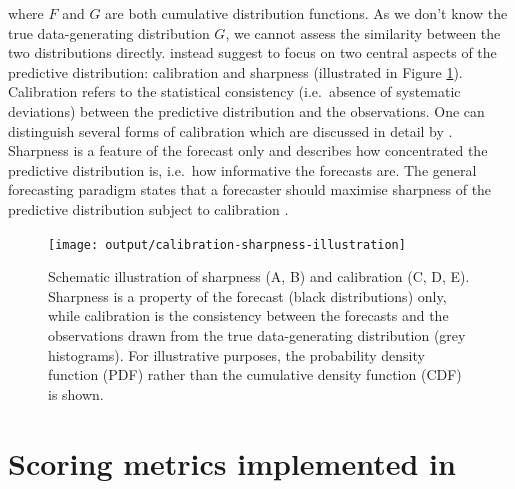 \documentclass[
]{jss}
\begin{document}
where \(F\) and \(G\) are both cumulative distribution functions. As we
don't know the true data-generating distribution \(G\), we cannot assess
the similarity between the two distributions directly.
\cite{gneitingProbabilisticForecastsCalibration2007} instead suggest to
focus on two central aspects of the predictive distribution: calibration
and sharpness (illustrated in Figure \ref{fig:forecast-paradigm}).
Calibration refers to the statistical consistency (i.e.~absence of
systematic deviations) between the predictive distribution and the
observations. One can distinguish several forms of calibration which are
discussed in detail by
\cite{gneitingProbabilisticForecastsCalibration2007}. Sharpness is a
feature of the forecast only and describes how concentrated the
predictive distribution is, i.e.~how informative the forecasts are. The
general forecasting paradigm states that a forecaster should maximise
sharpness of the predictive distribution subject to calibration
\citep{gneitingProbabilisticForecastsCalibration2007}.

\begin{CodeChunk}
\begin{figure}

{\centering \texttt{[image: output/calibration-sharpness-illustration]} 

}

\caption[Schematic illustration of sharpness (A, B) and calibration (C, D, E)]{Schematic illustration of sharpness (A, B) and calibration (C, D, E). Sharpness is a property of the forecast (black distributions) only, while calibration is the consistency between the forecasts and the observations drawn from the true data-generating distribution (grey histograms). For illustrative purposes, the probability density function (PDF) rather than the cumulative density function (CDF) is shown.}\label{fig:forecast-paradigm}
\end{figure}
\end{CodeChunk}

\section[Scoring metrics implemented in scoringutils]{Scoring metrics
implemented in }\label{metrics}
\end{document}
